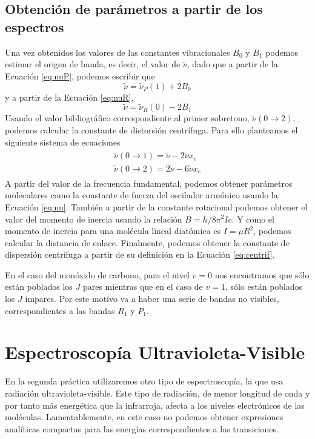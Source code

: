 \documentclass{tufte-book}
\begin{document}
\section{Obtención de parámetros a partir de los espectros}
Una vez obtenidos los valores de las constantes
vibracionales $B_0$ y $B_1$ podemos estimar el origen de banda,
es decir, el valor de $\tilde{\nu}$, dado que a partir de la 
Ecuación \ref{eq:nuP}, podemos escribir que
\begin{equation}
    \tilde{\nu} = \tilde{\nu}_P(1) + 2B_0 
\end{equation}
y a partir de la Ecuación \ref{eq:nuR},
\begin{equation}
    \tilde{\nu} = \tilde{\nu}_R(0) - 2B_1 
\end{equation}
Usando el valor bibliográfico correspondiente al primer sobretono,
$\tilde{\nu}(0\rightarrow 2)$, podemos calcular la constante de 
distorsión centrífuga. Para ello planteamos el siguiente
sistema de ecuaciones
\begin{align}
\begin{split}
\tilde{\nu}(0\rightarrow 1) = \tilde{\nu} - 2\tilde{\nu}x_e\\
\tilde{\nu}(0\rightarrow 2) = 2\tilde{\nu} - 6\tilde{\nu}x_e
\end{split}
\end{align}
A partir del valor de la frecuencia fundamental, podemos
obtener parámetros moleculares como la constante de fuerza
del oscilador armónico usando la Ecuación \ref{eq:nu}.
También a partir de la constante rotacional podemos obtener
el valor del momento de inercia usando la relación 
$B=h/8\pi^2Ic$. Y como el momento de inercia para una molécula
lineal diatómica es $I=\mu R^2$, podemos calcular la 
distancia de enlace. Finalmente, podemos obtener la
constante de dispersión centrífuga a partir de su definición
en la Ecuación \ref{eq:centrif}.

En el caso del monóxido de carbono, para el nivel $v=0$ nos
encontramos que sólo están poblados los $J$
pares mientras que en el caso de $v=1$, sólo están poblados los
$J$ impares. Por este motivo va a haber una serie de bandas no
visibles, correspondientes a las bandas $R_1$ y $P_1$.

\chapter[UV-visible]{Espectroscopía Ultravioleta-Visible}
En la segunda práctica utilizaremos otro tipo de espectroscopía,
la que usa radiación ultravioleta-visible. Este tipo de radiación,
de menor longitud de onda y por tanto más energética que la 
infrarroja, afecta a los niveles electrónicos de las moléculas.
Lamentablemente, en este caso no podemos obtener expresiones
analíticas compactas para las energías 
correspondientes a las transiciones. 
\end{document}
